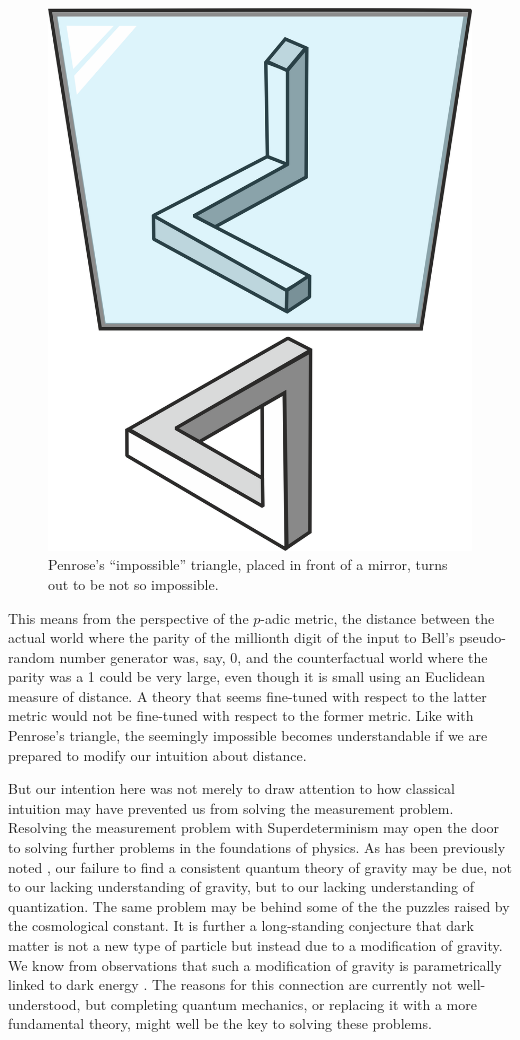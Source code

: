 \documentclass[12pt]{article}
\begin{document}

\begin{figure}[ht]
  \begin{center}
    \includegraphics[width=.35\textwidth]{triangle.png}
  \end{center}
  {\caption{Penrose's ``impossible'' triangle, placed in front of a mirror, turns out to be not so impossible. \label{fig1} }}
\end{figure}




This means from the perspective of the $p$-adic metric, the distance between the actual world where the parity of the millionth digit of the input to Bell's pseudo-random number generator was, say, 0, and the counterfactual world where the parity was a 1 could be very large, even though it is small using an Euclidean measure of distance. A theory that seems fine-tuned with respect to the latter metric would not be fine-tuned with respect to the former metric. Like with Penrose's triangle, the seemingly impossible becomes understandable if we are prepared to modify our intuition about distance. 

But our intention here was not merely to draw attention to how classical intuition may have prevented us from solving the measurement problem. Resolving the measurement problem with Superdeterminism may open the door to solving further problems in the foundations of physics. As has been previously noted \cite{Hossenfelder:2012uy}, our failure to find a consistent quantum theory of gravity may be due, not to our lacking understanding of gravity, but to our lacking understanding of quantization. The same problem may be behind some of the the puzzles raised by the cosmological constant. It is further a long-standing conjecture that dark matter is not a new type of particle but instead due to a modification of gravity. We know from observations that such a modification of gravity is parametrically linked to dark energy \cite{one}. The reasons for this connection are currently not well-understood, but completing quantum mechanics, or replacing it with a more fundamental theory, might well be the key to solving these problems.
\end{document}

